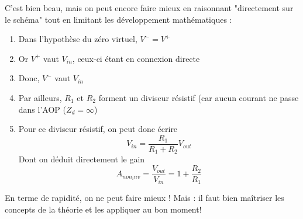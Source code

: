 C'est bien beau, mais on peut encore faire mieux en raisonnant "directement sur le schéma" tout en limitant les développement mathématiques :
\begin{enumerate}
	\item Dans l'hypothèse du zéro virtuel, $V^- = V^+$
	\item Or $V^+$ vaut $V_{in}$, ceux-ci étant en connexion directe
	\item Donc, $V^-$ vaut $V_{in}$
	\item Par ailleurs, $R_1$ et $R_2$ forment un diviseur résistif (car aucun courant ne passe dans l'AOP ($Z_d = \infty$)
	\item Pour ce diviseur résistif, on peut donc écrire
	      \begin{equation}
	      	V_{in} = \frac{R_1}{R_1+R_2}V_{out}
	      \end{equation}
	      Dont on déduit directement le gain
	      \begin{equation}
	      	A_{non_inv} = \frac{V_{out}}{V_{in}} = 1+\frac{R_2}{R_1}
	      \end{equation}
\end{enumerate}

En terme de rapidité, on ne peut faire mieux ! Mais : il faut bien maîtriser les concepts de la théorie et les appliquer au bon moment! 

